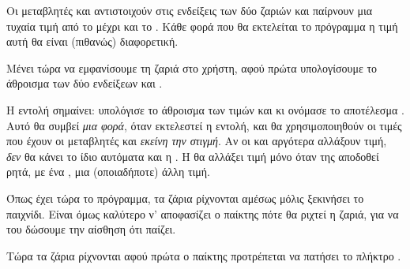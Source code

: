\documentclass[a4paper,11pt,oneside]{book}
\begin{document}

\clearpage
Οι μεταβλητές  και  αντιστοιχούν στις ενδείξεις των δύο ζαριών και παίρνουν μια τυχαία τιμή από το  μέχρι και το . Κάθε φορά που θα εκτελείται το πρόγραμμα η τιμή αυτή θα είναι (πιθανώς) διαφορετική.

Μένει τώρα να εμφανίσουμε τη ζαριά στο χρήστη, αφού πρώτα υπολογίσουμε το άθροισμα των δύο ενδείξεων  και .


Η εντολή  σημαίνει: υπολόγισε το άθροισμα των τιμών  και  κι ονόμασε το αποτέλεσμα . Αυτό θα συμβεί \emph{μια φορά}, όταν εκτελεστεί η εντολή, και θα χρησιμοποιηθούν οι τιμές που έχουν οι μεταβλητές  και  \emph{εκείνη την στιγμή}. 
Αν οι  και  αργότερα αλλάξουν τιμή, \emph{δεν} θα κάνει το ίδιο αυτόματα και η . Η  θα αλλάξει τιμή μόνο όταν της αποδοθεί ρητά, με ένα \pyinline{=}, μια (οποιαδήποτε) άλλη τιμή. 

Όπως έχει τώρα το πρόγραμμα, τα ζάρια ρίχνονται αμέσως μόλις
ξεκινήσει το παιχνίδι. Είναι όμως καλύτερο ν’ αποφασίζει ο παίκτης
πότε θα ριχτεί η ζαριά, για να του δώσουμε την αίσθηση ότι παίζει.


Τώρα τα ζάρια ρίχνονται αφού πρώτα ο παίκτης προτρέπεται να πατήσει το πλήκτρο .
\end{document}
